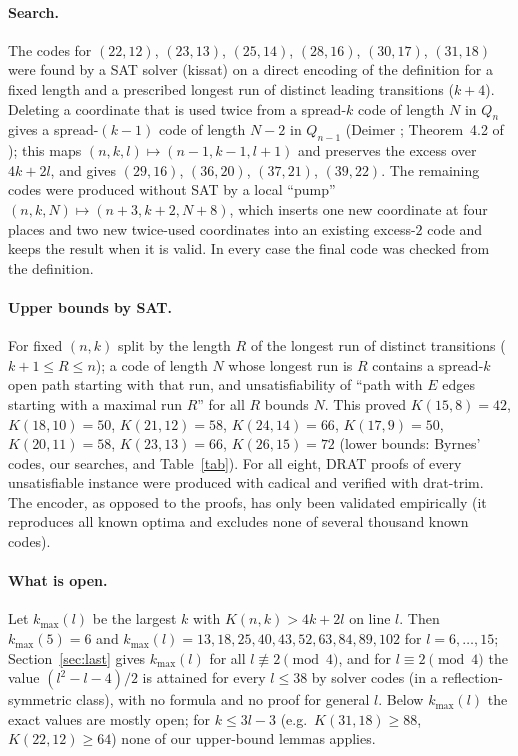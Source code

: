 \documentclass[11pt]{article}
\theoremstyle{remark}
\begin{document}
\paragraph{Search.} The codes for $(22,12)$, $(23,13)$, $(25,14)$, $(28,16)$, $(30,17)$, $(31,18)$ were found by a SAT solver
(kissat) on a direct encoding of the definition for a fixed length and a prescribed longest run of distinct leading transitions
($k+4$). Deleting a coordinate that is used twice from a spread-$k$ code of length $N$ in $Q_n$ gives a spread-$(k-1)$ code of length
$N-2$ in $Q_{n-1}$ (Deimer \cite{De}; Theorem~4.2 of \cite{B1}); this maps $(n,k,l)\mapsto(n-1,k-1,l+1)$ and preserves the excess
over $4k+2l$, and gives $(29,16)$, $(36,20)$, $(37,21)$, $(39,22)$. The remaining codes were produced without SAT by a local ``pump''
$(n,k,N)\mapsto(n+3,k+2,N+8)$, which inserts one new coordinate at four places and two new twice-used coordinates into an existing
excess-$2$ code and keeps the result when it is valid. In every case the final code was checked from the definition.

\paragraph{Upper bounds by SAT.} For fixed $(n,k)$ split by the length $R$ of the longest run of distinct
transitions ($k+1\le R\le n$); a code of length $N$ whose longest run is $R$ contains a spread-$k$ open path
starting with that run, and unsatisfiability of ``path with $E$ edges starting with a maximal run $R$'' for all $R$ bounds $N$.
This proved $K(15,8)=42$, $K(18,10)=50$, $K(21,12)=58$, $K(24,14)=66$, $K(17,9)=50$, $K(20,11)=58$, $K(23,13)=66$, $K(26,15)=72$
(lower bounds: Byrnes' codes, our searches, and Table~\ref{tab}). For all eight, DRAT proofs of every unsatisfiable instance were produced with cadical and verified with drat-trim. The encoder, as opposed to the proofs, has only been validated empirically
(it reproduces all known optima and excludes none of several thousand known codes).

\paragraph{What is open.} Let $k_{\max}(l)$ be the largest $k$ with $K(n,k)>4k+2l$ on line $l$. Then $k_{\max}(5)=6$ and
$k_{\max}(l)=13,18,25,40,43,52,63,84,89,102$ for $l=6,\dots,15$; Section~\ref{sec:last} gives $k_{\max}(l)$ for all $l\not\equiv 2\pmod 4$,
and for $l\equiv 2\pmod 4$ the value $(l^2-l-4)/2$ is attained for every $l\le 38$ by solver codes (in a reflection-symmetric class),
with no formula and no proof for general $l$. Below $k_{\max}(l)$ the exact values are mostly open; for $k\le 3l-3$ (e.g.\
$K(31,18)\ge 88$, $K(22,12)\ge 64$) none of our upper-bound lemmas applies.
\end{document}
